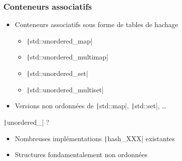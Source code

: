 \documentclass[C++.tex]{subfiles}
\begin{document}
\begin{frame}[fragile]
	\frametitle{Conteneurs associatifs}
	\begin{itemize}
		\item Conteneurs associatifs sous forme de tables de hachage
		\begin{itemize}
			\item \texttt|std::unordered_map|
			\item \texttt|std::unordered_multimap|
			\item \texttt|std::unordered_set|
			\item \texttt|std::unordered_multiset|
		\end{itemize}
		\item Versions non ordonnées de \texttt|std::map|, \texttt|std::set|, \ldots{}
	\end{itemize}

	\begin{block}{\texttt|unordered_| ?}
		\begin{itemize}
			\item Nombreuses implémentations \texttt|hash_XXX| existantes
			\item Structures fondamentalement non ordonnées
		\end{itemize}
	\end{block}
\end{frame}
\end{document}
